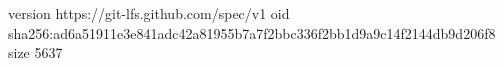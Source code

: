 version https://git-lfs.github.com/spec/v1
oid sha256:ad6a51911e3e841adc42a81955b7a7f2bbc336f2bb1d9a9c14f2144db9d206f8
size 5637

